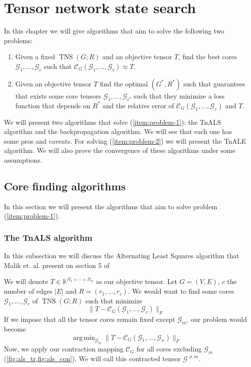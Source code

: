 \documentclass[11pt,a4paper,openright,oneside]{book}
\numberwithin{equation}{section}
\newcommand{\figref}[1]{\cref{#1}}
\DeclareMathOperator{\TNS}{TNS}
\DeclareMathOperator*{\argmin}{arg\,min}
\begin{document}
{ %






\chapter{Tensor network state search}

In this chapter we will give algorithms that aim to solve the following two problems:
\begin{enumerate}
    \item \label{item:problem-1} Given a fixed $\TNS(G; R)$ and an objective tensor $T$, find the best cores $\mathcal{G}_1, \dots, \mathcal{G}_c$ such that
        $\mathcal{C}_G (\mathcal{G}_1, \dots, \mathcal{G}_c) \approx T$.
    \item \label{item:problem-2} Given an objective tensor $T$ find the optimal $(G^*, R^*)$ such that guarantees that exists some core tensors
        $\mathcal{G}_1, \dots, \mathcal{G}_{c^*}$ such that they minimize a loss function that depends on $R^*$ and the relative
        error of $\mathcal{C}_G (\mathcal{G}_1, \dots, \mathcal{G}_c)$ and $T$.
\end{enumerate}

We will present two algorithms that solve (\ref{item:problem-1}): the TnALS algorithm and the backpropagation algorithm. We will
see that each one has some pros and caveats. For solving (\ref{item:problem-2}) we will present the TnALE algorithm. We will also prove 
the convergence of these algorithms under some assumptions.

\section{Core finding algorithms}

In this section we will present the algorithms that aim to solve problem (\ref{item:problem-1}).

\subsection{The TnALS algorithm}

In this subsection we will discuss the Alternating Least Squares algorithm that Malik et. al. present on section 5 of
\cite{malikSamplingBasedDecompositionAlgorithms2022}

We will denote $T \in \mathbb{K}^{N_1 \times \cdots \times N_n}$ as our objective tensor. Let $G = (V, E)$, $c$ the number of edges $|E|$ and $R = (r_1, \dots, r_c)$.
We would want to find some cores
$\mathcal{G}_1, \dots, \mathcal{G}_c$ of $\TNS(G; R)$ such that minimize
$$\|T - \mathcal{C}_G (\mathcal{G}_1, \dots, \mathcal{G}_c)\|_F$$
If we impose that all the tensor cores remain fixed except $\mathcal{G}_m$, our problem would become
$$\argmin_{\mathcal{G}_m} \|T - \mathcal{C}_G(\mathcal{G}_1, \dots, \mathcal{G}_n)\|_F$$
Now, we apply our contraction mapping $\mathcal{C}_G$ for all cores excluding $\mathcal{G}_m$ (\figref{fig:als_tr,fig:als_con}).
We will call this contracted tensor $\mathcal{G}^{\neq m}$. 

}
\end{document}

